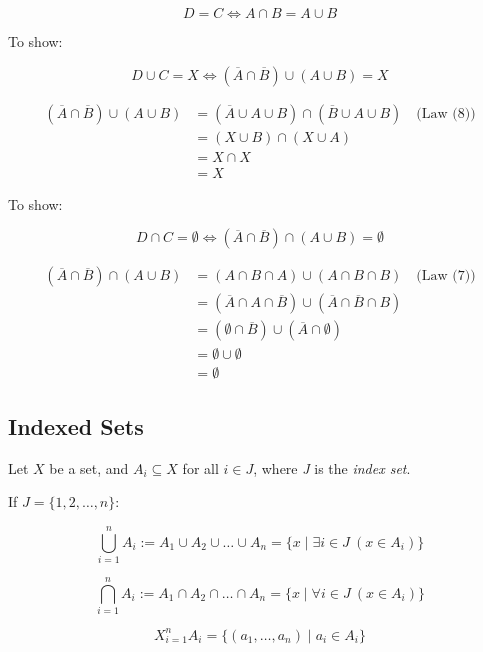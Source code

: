 \[
	D = C \iff A \cap B = A \cup B
\]

To show:

\[
	D \cup C = X \iff (\overline{A} \cap \overline{B}) \cup (A \cup B) = X
\]

\begin{align*}
	(\overline{A} \cap \overline{B}) \cup (A \cup B)
	 & = (\overline{A} \cup A \cup B) \cap (\overline{B} \cup A \cup B) \quad \text{(Law (8))} \\
	 & = (X \cup B) \cap (X \cup A)                                                            \\
	 & = X \cap X                                                                              \\
	 & = X
\end{align*}

To show:

\[
	D \cap C = \emptyset \iff (\overline{A} \cap \overline{B}) \cap (A \cup B) = \emptyset
\]

\begin{align*}
	(\overline{A} \cap \overline{B}) \cap (A \cup B)
	 & = (A \cap B \cap A) \cup (A \cap B \cap B) \quad \text{(Law (7))}                      \\
	 & = (\overline{A} \cap A \cap \overline{B}) \cup (\overline{A} \cap \overline{B} \cap B) \\
	 & = (\emptyset \cap \overline{B}) \cup (\overline{A} \cap \emptyset)                     \\
	 & = \emptyset \cup \emptyset                                                             \\
	 & = \emptyset
\end{align*}

\QED

\subsection{Indexed Sets}

Let \(X\) be a set, and \( A_i \subseteq X \) for all \( i \in J \), where \emph{J} is the 
\emph{index set}.

If \( J = \{1, 2, \dots, n\} \):

\[
	\bigcup_{i=1}^{n} A_i := A_1 \cup A_2 \cup \dots \cup A_n = \{ x \mid \exists i \in J \ (x \in A_i) \}
\]

\[
	\bigcap_{i=1}^{n} A_i := A_1 \cap A_2 \cap \dots \cap A_n = \{ x \mid \forall i \in J \ (x \in A_i) \}
\]

\[
	X_{i=1}^{n} A_i = \{(a_1, \dots, a_n) \mid a_i \in A_i \}
\]

